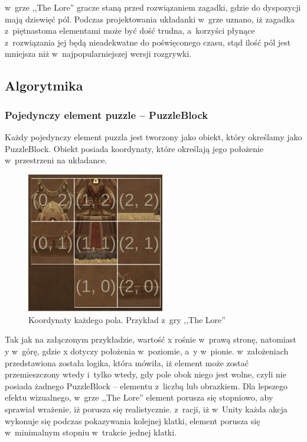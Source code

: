 \documentclass[oneside,polski,logo]{amuthesis}
\begin{document}
w~grze ,,The Lore'' gracze staną przed rozwiązaniem zagadki, gdzie do dyspozycji mają dziewięć pól. Podczas projektowania układanki w~grze uznano, iż zagadka z~piętnastoma elementami może być dość trudna, a~korzyści płynące z~rozwiązania jej będą nieadekwatne do poświęconego czasu, stąd ilość pól jest mniejsza niż w~najpopularniejszej wersji rozgrywki.
\subsection{Algorytmika}
\subsubsection{Pojedynczy element puzzle – PuzzleBlock}

\par Każdy pojedynczy element puzzla jest tworzony jako obiekt, który określamy jako PuzzleBlock. Obiekt posiada koordynaty, które określają jego położenie w~przestrzeni na układance.

\begin{figure}[h]
\centering
\includegraphics[width=6cm]{images/tyrek/coord_puzzle.png}
\caption{Koordynaty każdego pola. Przykład z~gry ,,The Lore''}
\end{figure}

Tak jak na załączonym przykładzie, wartość x rośnie w~prawą stronę, natomiast y w~górę, gdzie x dotyczy położenia w~poziomie, a~y w~pionie. w~założeniach przedstawiona została logika, która mówiła, iż element może zostać przemieszczony wtedy i~tylko wtedy, gdy pole obok niego jest wolne, czyli nie posiada żadnego PuzzleBlock – elementu z~liczbą lub obrazkiem. Dla lepszego efektu wizualnego, w~grze ,,The Lore'' element porusza się stopniowo, aby sprawiał wrażenie, iż porusza się realistycznie. z~racji, iż w~Unity każda akcja wykonuje się podczas pokazywania kolejnej klatki, element porusza się w~minimalnym stopniu w~trakcie jednej klatki. 
\end{document}
